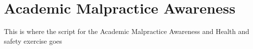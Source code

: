 \chapter{Academic Malpractice Awareness}

\begin{note}
  This is where the script for the Academic Malpractice Awareness and Health and safety exercise goes

\end{note}

